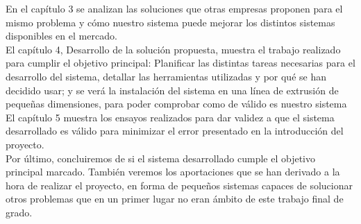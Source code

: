 En el capítulo 3 se analizan las soluciones que otras empresas proponen para el mismo problema y cómo nuestro sistema puede mejorar los distintos sistemas disponibles en el mercado.\\

El capítulo 4, Desarrollo de la solución propuesta, muestra el trabajo realizado para cumplir el objetivo principal: Planificar las distintas tareas necesarias para el desarrollo del sistema, detallar las herramientas utilizadas y por qué se han decidido usar; y se verá la instalación del sistema en una línea de extrusión de pequeñas dimensiones, para poder comprobar como de válido es nuestro sistema\\

El capítulo 5 muestra los ensayos realizados para dar validez a que el sistema desarrollado es válido para minimizar el error presentado en la introducción del proyecto.\\

Por último, concluiremos de si el sistema desarrollado cumple el objetivo principal marcado. También veremos los aportaciones que se han derivado a la hora de realizar el proyecto, en forma de pequeños sistemas capaces de solucionar otros problemas que en un primer lugar no eran ámbito de este trabajo final de grado.